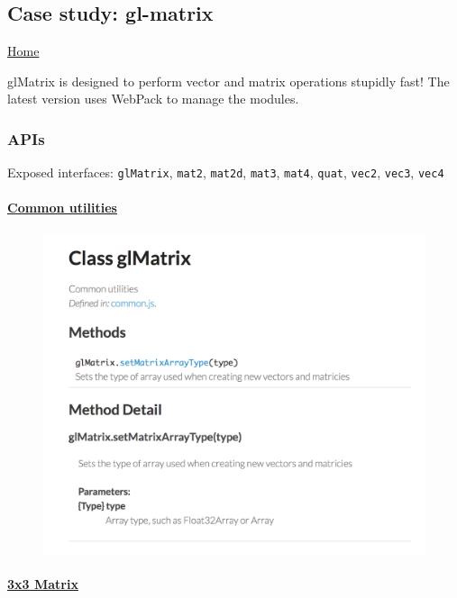 \documentclass[]{article}
\begin{document}
\subsection{Case study: gl-matrix}\label{case-study-gl-matrix}

\href{http://glmatrix.net}{Home}

glMatrix is designed to perform vector and matrix operations stupidly
fast! The latest version uses WebPack to manage the modules.

\subsubsection{APIs}\label{apis}

Exposed interfaces: \texttt{glMatrix}, \texttt{mat2}, \texttt{mat2d},
\texttt{mat3}, \texttt{mat4}, \texttt{quat}, \texttt{vec2},
\texttt{vec3}, \texttt{vec4}

\paragraph{\href{http://glmatrix.net/docs/2.2.0/symbols/glMatrix.html}{Common
utilities}}\label{common-utilities}

\begin{figure}[htbp]
\centering
\includegraphics{images/gl-matrix.png}
\end{figure}

\paragraph{\href{http://glmatrix.net/docs/2.2.0/symbols/mat3.html}{3x3
Matrix}}\label{x3-matrix}
\end{document}
